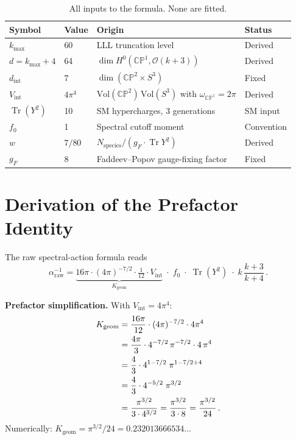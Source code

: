 \documentclass[11pt]{article}
\newcommand{\Tr}{\operatorname{Tr}}
\newcommand{\CP}{\mathbb{CP}}
\begin{document}
\begin{table}[h]
\centering
\begin{tabular}{@{}llll@{}}
\toprule
\textbf{Symbol} & \textbf{Value} & \textbf{Origin} & \textbf{Status} \\
\midrule
$k_{\max}$          & 60   & LLL truncation level                           & Derived \\
$d = k_{\max}+4$    & 64   & $\dim H^0(\CP^1, \mathcal{O}(k{+}3))$         & Derived \\
$d_{\mathrm{int}}$  & 7    & $\dim(\CP^2 \times S^3)$                       & Fixed \\
$V_{\mathrm{int}}$  & $4\pi^4$  & $\mathrm{Vol}(\CP^2)\,\mathrm{Vol}(S^3)$
                                   with $\omega_{\CP^1}=2\pi$                & Derived \\
$\Tr(Y^2)$          & 10   & SM hypercharges, 3 generations                 & SM input \\
$f_0$               & 1    & Spectral cutoff moment                         & Convention \\
$w$                 & $7/80$ & $N_{\mathrm{species}}/(g_F \cdot \Tr Y^2)$   & Derived \\
$g_F$               & 8    & Faddeev--Popov gauge-fixing factor             & Fixed \\
\bottomrule
\end{tabular}
\caption{All inputs to the formula.  None are fitted.}
\label{tab:inputs}
\end{table}


\section{Derivation of the Prefactor Identity}

The raw spectral-action formula reads
\begin{equation}
\alpha^{-1}_{\mathrm{raw}}
= \underbrace{16\pi \cdot (4\pi)^{-7/2} \cdot \tfrac{1}{12}
  \cdot V_{\mathrm{int}}}_{K_{\mathrm{geom}}}
\;\cdot\; f_0 \;\cdot\; \Tr(Y^2) \;\cdot\;
k\,\frac{k+3}{k+4}\,.
\label{eq:raw}
\end{equation}

\noindent\textbf{Prefactor simplification.}\;
With $V_{\mathrm{int}} = 4\pi^4$:
\begin{align}
K_{\mathrm{geom}}
&= \frac{16\pi}{12} \cdot (4\pi)^{-7/2} \cdot 4\pi^4
\notag\\
&= \frac{4\pi}{3} \cdot 4^{-7/2}\,\pi^{-7/2} \cdot 4\,\pi^4
\notag\\
&= \frac{4}{3} \cdot 4^{1-7/2}\;\pi^{1 - 7/2 + 4}
\notag\\
&= \frac{4}{3} \cdot 4^{-5/2}\;\pi^{3/2}
\notag\\
&= \frac{\pi^{3/2}}{3 \cdot 4^{3/2}}
= \frac{\pi^{3/2}}{3 \cdot 8}
= \frac{\pi^{3/2}}{24}\,.
\label{eq:Kgeom}
\end{align}
%
Numerically: $K_{\mathrm{geom}} = \pi^{3/2}/24 = 0.232013666534\ldots$
\end{document}
